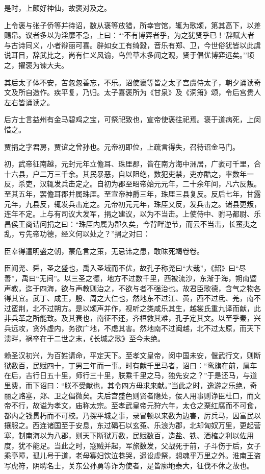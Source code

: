 \documentclass[]{article}
\begin{document}
是时，上颇好神仙，故褒对及之。

上令褒与张子侨等并待诏，数从褒等放猎，所幸宫馆，辄为歌颂，第其高下，以差赐帛。议者多以为淫靡不急，上曰：```不有博弈者乎，为之犹贤乎已！'辞赋大者与古诗同义，小者辩丽可喜。辟如女工有绮縠，音乐有郑、卫，今世俗犹皆以此虞说耳目，辞武比之，尚有仁义风谕，鸟兽草木多闻之观，贤于倡优博弈远矣。''顷之，擢褒为谏大夫。

其后太子体不安，苦忽忽善忘，不乐。诏使褒等皆之太子宫虞侍太子，朝夕诵读奇文及所自造作。疾平复，乃归。太子喜褒所为《甘泉》及《洞箫》颂，令后宫贵人左右皆诵读之。

后方士言益州有金马碧鸡之宝，可祭祀致也，宣帝使褒往祀焉。褒于道病死，上闵惜之。

贾捐之字君房，贾谊之曾孙也。元帝初即位，上疏言得失，召待诏金马门。

初，武帝征南越，元封元年立儋耳、珠厓郡，皆在南方海中洲居，广袤可千里，合十六县，户二万三千余。其民暴恶，自以阻绝，数犯吏禁，吏亦酷之，率数年一反，杀吏，汉辄发兵击定之。自初为郡至昭帝始元元年，二十余年间，凡六反叛。至其五年，罢儋耳郡并属珠厓。至宣帝神爵三年，珠厓三县复反。反后七年，甘露元年，九县反，辄发兵击定之。元帝初元元年，珠厓又反，发兵击之。诸县更叛，连年不定。上与有司议大发军，捐之建议，以为不当击。上使侍中、驸马都尉、乐昌侯王商诘问捐之曰：``珠厓内属为郡久矣，今背畔逆节，而云不当击，长蛮夷之乱，亏先帝功德，经义何以处之？''捐之对曰：

臣幸得遭明盛之朝，蒙危言之策，无忌讳之患，敢昧死竭卷卷。

臣闻尧、舜，圣之盛也，禹入圣域而不优，故孔子称尧曰``大哉''，《韶》曰``尽善''，禹曰``无间''。以三圣之德，地方不过数千里，西被流沙，东渐于海，朔南暨声教，迄于四海，欲与声教则治之，不欲与者不强治也。故君臣歌德，含气之物各得其宜。武丁、成王，殷、周之大仁也，然地东不过江、黄，西不过氐、羌，南不过蛮荆，北不过朔方。是以颂声并作，视听之类咸乐其生，越裳氏重九译而献，此非兵革之所能致。及其衰也，南征不还，齐桓救其难，孔子定其文。以至乎秦，兴兵远攻，贪外虚内，务欲广地，不虑其害。然地南不过闽越，北不过太原，而天下溃畔，祸卒在于二世之末，《长城之歌》至今未绝。

赖圣汉初兴，为百姓请命，平定天下。至孝文皇帝，闵中国未安，偃武行文，则断狱数百，民赋四十，丁男三年而一事。时有献千里马者，诏曰：``鸾旗在前，属车在后，吉行日五十里，师行三十里，朕乘千里之马，独先安之？''于是还马，与道里费，而下诏曰：``朕不受献也，其令四方毋求来献。''当此之时，逸游之乐绝，奇丽之赂塞，郑、卫之倡微矣。夫后宫盛色则贤者隐处，佞人用事则诤臣杜口，而文帝不行，故谥为孝文，庙称太宗。至孝武皇帝元狩六年，太仓之粟红腐而不可食，都内之钱贯朽而不可校。乃探平城之事，录冒顿以来数为边害，厉兵马，因富民以攘服之。西连诸国至于安息，东过碣石以玄菟、乐浪为郡，北却匈奴万里，更起营塞，制南海以为八郡，则天下断狱万数，民赋数百，造盐、铁、酒榷之利以佐用度，犹不能足。当此之时，寇贼并起，军旅数发，父战死于前，子斗伤于后，女子乘亭障，孤儿号于道，老母寡妇饮泣巷哭，遥设虚祭，想魂乎万里之外。淮南王盗写虎符，阴聘名士，关东公孙勇等诈为使者，是皆廓地泰大，征伐不休之故也。
\end{document}
